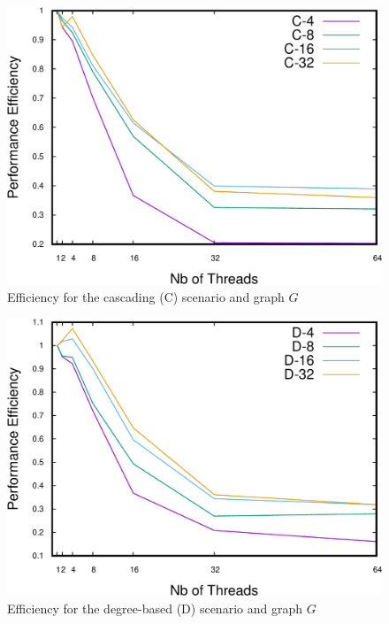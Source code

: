 \begin{figure}
\centering
\includegraphics[scale=0.35]{bench/generated/efficiency-c-1-crop.pdf}
\caption{Efficiency for the cascading (C) scenario and graph $G$}
\label{fig:effc1}
\end{figure}

\begin{figure}
\centering
\includegraphics[scale=0.35]{bench/generated/efficiency-d-1-crop.pdf}
\caption{Efficiency for the degree-based (D) scenario and graph $G$}
\label{fig:effd1}
\end{figure}


